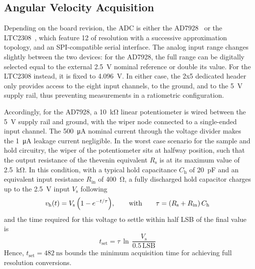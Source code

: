 \subsection{Angular Velocity Acquisition}\label{subsec:adc}

Depending on the board revision, the ADC is either the AD7928~\cite{ad7928} or the LTC2308~\cite{ltc2308}, which feature \qty{12}{\bit} of resolution with a successive approximation topology, and an SPI-compatible serial interface. The analog input range changes slightly between the two devices: for the AD7928, the full range can be digitally selected equal to the external \qty{2.5}{\volt} nominal reference or double its value. For the LTC2308 instead, it is fixed to \qty{4.096}{\volt}. In either case, the 2x5 dedicated header only provides access to the eight input channels, to the ground, and to the \qty{5}{\volt} supply rail, thus preventing measurements in a ratiometric configuration.
    
Accordingly, for the AD7928, a \qty{10}{\kohm} linear potentiometer is wired between the \qty{5}{\volt} supply rail and ground, with the wiper node connected to a single-ended input channel. The \qty{500}{\uA} nominal current through the voltage divider makes the \qty{1}{\uA} leakage current negligible.
In the worst case scenario for the sample and hold circuitry, the wiper of the potentiometer sits at halfway position, such that the output resistance of the thevenin equivalent $R_\text{s}$ is at its maximum value of \qty{2.5}{\kohm}. 
In this condition, with a typical hold capacitance $C_\text{h}$ of \qty{20}{\pF} and an equivalent input resistance $R_\text{in}$ of \qty{400}{\ohm}, a fully discharged hold capacitor charges up to the \qty{2.5}{\volt} input $V_\text{s}$ following
\[
    v_\text{h}\pqty*{t} = V_\text{s}\,\pqty*{1-e^{-t/\tau}}
    ,\qquad \text{with}\qquad \tau = \pqty*{R_\text{s}+R_\text{in}}\,C_\text{h}
\]
and the time required for this voltage to settle within half LSB of the final value is
\begin{equation}\label{eq:tset}
    t_\text{set} = \tau\,\ln\,\frac{V_\text{s}}{0.5 \,\text{LSB}}
\end{equation}
Hence, $t_\text{set} = \qty{482}{\ns}$ bounds the minimum acquisition time for achieving full resolution conversions.

